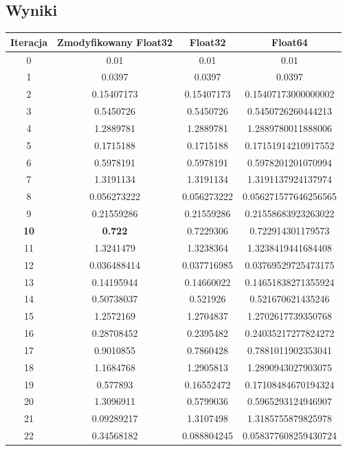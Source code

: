 \documentclass[]{article}
\begin{document}
\subsection{Wyniki}
\begin{table}[h!]
	\centering
	\begin{tabular}{||c c c c||} 
		\hline
		Iteracja & Zmodyfikowany \textbf{Float32} & \textbf{Float32} & \textbf{Float64} \\ [0.5ex] 
		\hline\hline
		0 & 0.01 & 0.01 & 0.01 \\
		1 & 0.0397 & 0.0397 & 0.0397 \\
		2 & 0.15407173 & 0.15407173 & 0.15407173000000002 \\
		3 & 0.5450726 & 0.5450726 & 0.5450726260444213 \\
		4 & 1.2889781 & 1.2889781 & 1.2889780011888006 \\
		5 & 0.1715188 & 0.1715188 & 0.17151914210917552 \\
		6 & 0.5978191 & 0.5978191 & 0.5978201201070994 \\
		7 & 1.3191134 & 1.3191134 & 1.3191137924137974 \\
		8 & 0.056273222 & 0.056273222 & 0.056271577646256565 \\
		9 & 0.21559286 & 0.21559286 & 0.21558683923263022 \\
		\textbf{10} & \textbf{0.722} &  0.7229306 & 0.722914301179573 \\
		11 & 1.3241479 & 1.3238364 & 1.3238419441684408 \\
		12 & 0.036488414 & 0.037716985 & 0.03769529725473175 \\
		13 & 0.14195944 & 0.14660022 & 0.14651838271355924 \\
		14 & 0.50738037 & 0.521926 & 0.521670621435246 \\
		15 & 1.2572169 & 1.2704837 & 1.2702617739350768 \\
		16 & 0.28708452 & 0.2395482 & 0.24035217277824272 \\
		17 & 0.9010855 & 0.7860428 & 0.7881011902353041 \\
		18 & 1.1684768 & 1.2905813 & 1.2890943027903075 \\
		19 & 0.577893 & 0.16552472 & 0.17108484670194324 \\
		20 & 1.3096911 & 0.5799036 & 0.5965293124946907 \\
		21 & 0.09289217 & 1.3107498 & 1.3185755879825978 \\
		22 & 0.34568182 & 0.088804245 & 0.058377608259430724 \\

\end{tabular}
\end{table}
\end{document}
